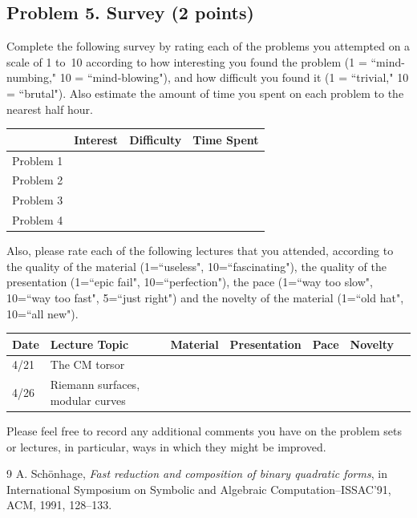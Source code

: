 \documentclass[11pt]{article}
\theoremstyle{definition}
\begin{document}
\subsection*{Problem 5. Survey (2 points)}

Complete the following survey by rating each of the problems you attempted on a scale of 1 to~10 according to how interesting you found the problem (1 = ``mind-numbing," 10 = ``mind-blowing"), and how difficult you found it (1 = ``trivial," 10 = ``brutal").  Also estimate the amount of time you spent on each problem to the nearest half hour.

\begin{center}
\begin{tabular}{l|r|r|r|}
& Interest & Difficulty & Time Spent\\\hline
Problem 1 & & & \\\hline
Problem 2 & & & \\\hline
Problem 3 & & & \\\hline
Problem 4 & & & \\\hline
\end{tabular}
\end{center}
\noindent
Also, please rate each of the following lectures that you attended, according to the quality of the material (1=``useless", 10=``fascinating"), the quality of the presentation (1=``epic fail", 10=``perfection"), the pace (1=``way too slow", 10=``way too fast", 5=``just right") and the novelty of the material (1=``old hat", 10=``all new").

\begin{center}
\begin{tabular}{l|l|r|r|r|r|r}
Date & Lecture Topic & Material &\!Presentation\! & Pace & Novelty\\\hline
4/21 & The CM torsor & & & & \\\hline 
4/26 & Riemann surfaces, modular curves & & & & \\\hline 
\end{tabular}
\end{center}

\noindent
Please feel free to record any additional comments you have on the problem sets or lectures, in particular, ways in which they might be improved.

\begin{thebibliography}{9}
 A. Sch\"{o}nhage, \emph{Fast reduction and composition of binary quadratic forms}, in International Symposium on Symbolic and Algebraic Computation--{ISSAC}'91, ACM, 1991, 128--133.
\end{thebibliography}
\end{document}
